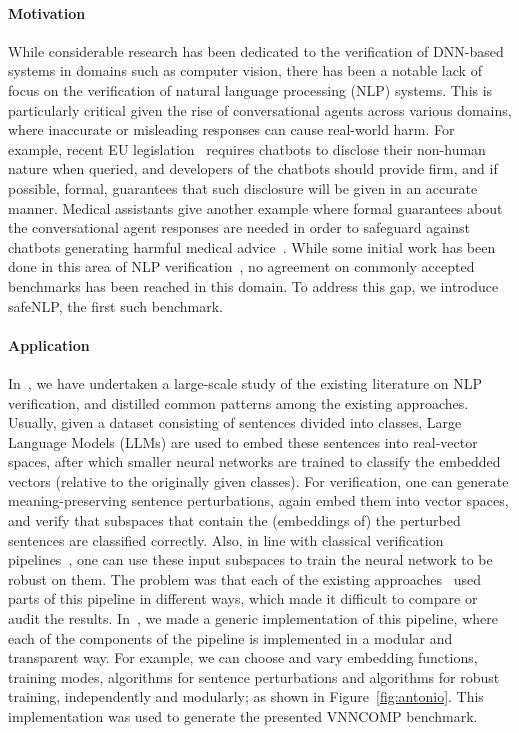 \documentclass[oneside,11pt,dvipsnames]{book}
\begin{document}
\paragraph*{Motivation}
While considerable research has been dedicated to the verification of DNN-based systems in domains such as computer vision, there has been a notable lack of focus on the verification of natural language processing (NLP) systems. This is particularly critical given the rise of conversational agents across various domains, where inaccurate or misleading responses can cause real-world harm. For example, recent EU legislation~\cite{EUlaw} requires chatbots to disclose their non-human nature when queried, and developers of the chatbots should provide firm, and if possible, formal, guarantees that such disclosure will be given in an accurate manner. Medical assistants give another example where formal guarantees about the conversational agent responses are needed in order to safeguard against chatbots  generating harmful medical advice~\cite{bickmore2018patient}. While some initial work has been done in this area of NLP verification~\cite{jia2019certified,huang2019achieving,welbl2020towards,zhang2021certified,wang2023robustness,ko2019popqorn,du2021cert,shi2020robustness,bonaert2021fast}, no agreement on commonly  accepted benchmarks has been reached in this domain. To address this gap, we introduce safeNLP, the first such benchmark. 

\paragraph*{Application}
In~\cite{casadio2024nlp}, we have undertaken a large-scale study of the existing literature on  NLP verification, and distilled common patterns among the existing approaches. Usually, given a dataset consisting of sentences divided into classes, Large Language Models (LLMs) are used to embed these sentences into real-vector spaces, after which smaller neural networks are trained to classify the embedded vectors (relative to the originally given classes). For verification, one can generate meaning-preserving sentence perturbations, again embed them into vector spaces, and verify that subspaces that contain the (embeddings of) the perturbed sentences are classified correctly. Also, in line with classical verification pipelines~\cite{CasadioKDKKAR22}, one can use these input subspaces to train the neural network to be robust on them.  The problem was that each of the existing approaches~\cite{jia2019certified,huang2019achieving,welbl2020towards,zhang2021certified,wang2023robustness,ko2019popqorn,du2021cert,shi2020robustness,bonaert2021fast} used parts of this pipeline in different ways, which made it difficult to compare or audit the results. In~\cite{casadio2023antonio,casadio2024nlp}, we made a generic implementation of this pipeline, 
where each of the components of the pipeline is implemented in a modular and transparent way. For example, we can choose  and vary embedding functions, training modes, algorithms for sentence perturbations and algorithms for robust training, independently and modularly; as shown in Figure~\ref{fig:antonio}. This implementation was used to generate the presented VNNCOMP benchmark.
\end{document}
